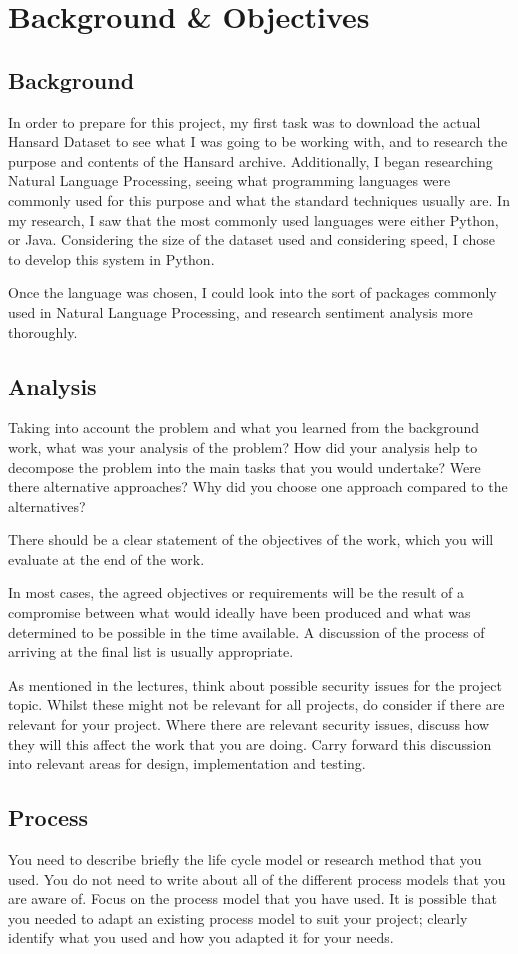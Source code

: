 \chapter{Background \& Objectives}

\section{Background}
In order to prepare for this project, my first task was to download the actual Hansard Dataset to see what I was going to be working with, and to research the purpose and contents of the Hansard archive. Additionally, I began researching Natural Language Processing, seeing what programming languages were commonly used for this purpose and what the standard techniques usually are. In my research, I saw that the most commonly used languages were either Python, or Java. Considering the size of the dataset used and considering speed, I chose to develop this system in Python.

Once the language was chosen, I could look into the sort of packages commonly used in Natural Language Processing, and research sentiment analysis more thoroughly. 

\section{Analysis}
Taking into account the problem and what you learned from the background work, what was your analysis of the problem? How did your analysis help to decompose the problem into the main tasks that you would undertake? Were there alternative approaches? Why did you choose one approach compared to the alternatives? 

There should be a clear statement of the objectives of the work, which you will evaluate at the end of the work. 

In most cases, the agreed objectives or requirements will be the result of a compromise between what would ideally have been produced and what was determined to be possible in the time available. A discussion of the process of arriving at the final list is usually appropriate.

As mentioned in the lectures, think about possible security issues for the project topic. Whilst these might not be relevant for all projects, do consider if there are relevant for your project. Where there are relevant security issues, discuss how they will this affect the work that you are doing. Carry forward this discussion into relevant areas for design, implementation and testing.

\section{Process}
You need to describe briefly the life cycle model or research method that you used. You do not need to write about all of the different process models that you are aware of. Focus on the process model that you have used. It is possible that you needed to adapt an existing process model to suit your project; clearly identify what you used and how you adapted it for your needs.
